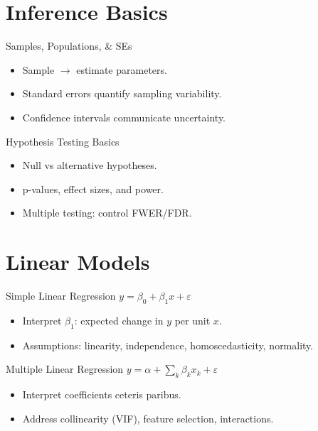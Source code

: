 \documentclass[aspectratio=169]{beamer}
\begin{document}
\section{Inference Basics}

\begin{frame}{Samples, Populations, \& SEs}
\begin{itemize}
  \item Sample $\to$ estimate parameters.
  \item Standard errors quantify sampling variability.
  \item Confidence intervals communicate uncertainty.
\end{itemize}
\end{frame}

\begin{frame}{Hypothesis Testing Basics}
\begin{itemize}
  \item Null vs alternative hypotheses.
  \item p-values, effect sizes, and power.
  \item Multiple testing: control FWER/FDR.
\end{itemize}
\end{frame}

\section{Linear Models}

\begin{frame}{Simple Linear Regression}
$y = \beta_0 + \beta_1 x + \varepsilon$
\begin{itemize}
  \item Interpret $\beta_1$: expected change in $y$ per unit $x$.
  \item Assumptions: linearity, independence, homoscedasticity, normality.
\end{itemize}
\end{frame}

\begin{frame}{Multiple Linear Regression}
$y = \alpha + \sum_k \beta_k x_k + \varepsilon$
\begin{itemize}
  \item Interpret coefficients ceteris paribus.
  \item Address collinearity (VIF), feature selection, interactions.
\end{itemize}
\end{frame}
\end{document}

